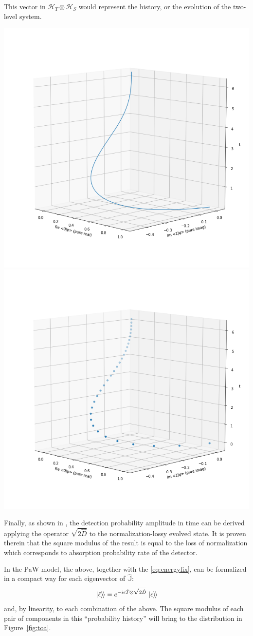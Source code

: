 \documentclass[a0,portrait]{a0poster}
\newcommand{\hilb}[1]{\mathcal{#1}}       %
\newcommand{\ox}{\otimes}
\newcommand{\smallback}{\hspace{-0.115em}}
\newcommand{\dket}[1]{\left.\left| #1 \right\rangle\smallback\right\rangle}
\newcommand{\pwspace}{\hilb{H}_T \ox \hilb{H}_S}
\begin{document}
\begin{multicols}{2}
This vector in $\pwspace$ would represent the history, or the evolution of the two-level system.
\begin{center}
  \includegraphics[width=0.45\linewidth]{2ldetect/3D-evol-cont.png}%
  \includegraphics[width=0.45\linewidth]{2ldetect/3D-evol-pw.png}
\end{center}\vspace{0.5cm}

Finally, as shown in \cite{RuschhauptAbsorption}, the detection probability amplitude
in time
can be derived applying the operator $\sqrt{2\hat{D}}$ to the normalization-lossy
evolved state. It is proven therein that the square modulus of the result is equal
to the loss of normalization which corresponds to absorption probability rate of the detector.

In the PaW model, the above, together with the \eqref{eq:energyfix},
can be formalized in a compact way for each eigenvector of $\hat{\mathbb{J}}$:
\begin{equation}
  \dket{\tilde{\epsilon}} = e^{-i\epsilon\hat{T} \ox \sqrt{2\hat{D}}} \dket{\epsilon}
\end{equation}
and, by linearity, to each combination of the above. The square modulus of
each pair of components in this ``probability history'' will bring to the distribution
in Figure~\ref{fig:toa}.


\end{multicols}
\end{document}
